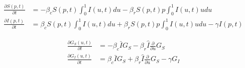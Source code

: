\documentclass{article}
\begin{document}
\begin{align*}
\frac{\partial S(p, t)}{\partial t} &=
	-\beta_c S(p, t) \int_{0}^1 I(u, t) du
	-\beta_r S(p, t) p \int_{0}^1 I(u, t) u du\\
\frac{\partial I(p, t)}{\partial t} &=
	\beta_c S(p, t) \int_{0}^1 I(u, t) du
	+ \beta_r S(p, t) p \int_{0}^1 I(u, t) u du - \gamma I(p, t)
\end{align*}

\begin{align*}
\frac{\partial G_S(u, t)}{\partial t} &= -\beta_c \bar{I} G_S - \beta_r \hat{I} \frac{\partial}{\partial u} G_S\\
\frac{\partial G_I(u, t)}{\partial t} &= \beta_c \bar{I} G_S + \beta_r \hat{I} \frac{\partial}{\partial u} G_S - \gamma G_I
\end{align*}
\end{document}
